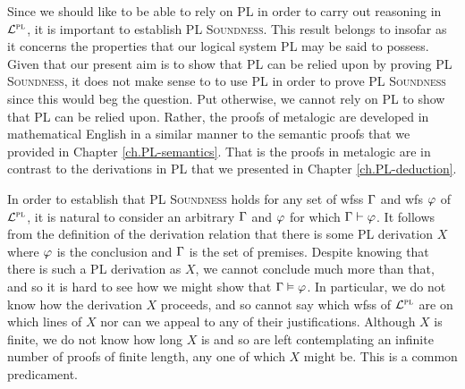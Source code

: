 %

Since we should like to be able to rely on PL in order to carry out reasoning in $\mathcal{L}^{\textsc{pl}}$, it is important to establish \textsc{PL Soundness}.
This result belongs to  insofar as it concerns the properties that our logical system PL may be said to possess.
Given that our present aim is to show that PL can be relied upon by proving \textsc{PL Soundness}, it does not make sense to to use PL in order to prove \textsc{PL Soundness} since this would beg the question.
Put otherwise, we cannot rely on PL to show that PL can be relied upon.
Rather, the proofs of metalogic are developed in mathematical English in a similar manner to the semantic proofs that we provided in Chapter \ref{ch.PL-semantics}.
That is the proofs in metalogic are  in contrast to the  derivations in PL that we presented in Chapter \ref{ch.PL-deduction}.

In order to establish that \textsc{PL Soundness} holds for any set of wfss $\Gamma$ and wfs $\varphi$ of $\mathcal{L}^{\textsc{pl}}$, it is natural to consider an arbitrary $\Gamma$ and $\varphi$ for which $\Gamma \vdash \varphi$. 
It follows from the definition of the derivation relation that there is some PL derivation $X$ where $\varphi$ is the conclusion and $\Gamma$ is the set of premises. 
Despite knowing that there is such a PL derivation as $X$, we cannot conclude much more than that, and so it is hard to see how we might show that $\Gamma \vDash \varphi$.
In particular, we do not know how the derivation $X$ proceeds, and so cannot say which wfss of $\mathcal{L}^{\textsc{pl}}$ are on which lines of $X$ nor can we appeal to any of their justifications.
Although $X$ is finite, we do not know how long $X$ is and so are left contemplating an infinite number of proofs of finite length, any one of which $X$ might be. 
This is a common predicament.

